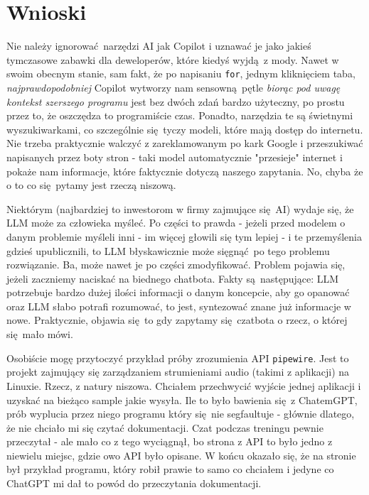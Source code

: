 	\newpage
\section{Wnioski}	%

Nie należy ignorować narzędzi AI jak Copilot i uznawać je jako jakieś tymczasowe zabawki dla deweloperów, które kiedyś wyjdą z mody. Nawet w swoim obecnym stanie, sam fakt, że po napisaniu \texttt{for}, jednym kliknięciem taba, \textit{najprawdopodobniej} Copilot wytworzy nam sensowną pętle \textit{biorąc pod uwagę kontekst szerszego programu} jest bez dwóch zdań bardzo użyteczny, po prostu przez to, że oszczędza to programiście czas. Ponadto, narzędzia te są świetnymi wyszukiwarkami, co szczególnie się tyczy modeli, które mają dostęp do internetu. Nie trzeba praktycznie walczyć z zareklamowanym po kark Google i przeszukiwać napisanych przez boty stron - taki model automatycznie "przesieje" internet i pokaże nam informacje, które faktycznie dotyczą naszego zapytania. No, chyba że o to co się pytamy jest rzeczą niszową.

Niektórym (najbardziej to inwestorom w firmy zajmujące się AI) wydaje się, że LLM może za człowieka myśleć. Po części to prawda - jeżeli przed modelem o danym problemie myśleli inni - im więcej głowili się tym lepiej - i te przemyślenia gdzieś upublicznili, to LLM błyskawicznie może sięgnąć po tego problemu rozwiązanie. Ba, może nawet je po części zmodyfikować. Problem pojawia się, jeżeli zaczniemy naciskać na biednego chatbota. Fakty są następujące: LLM potrzebuje bardzo dużej ilości informacji o danym koncepcie, aby go opanować oraz LLM słabo potrafi rozumować, to jest, syntezować znane już informacje w nowe. Praktycznie, objawia się to gdy zapytamy się czatbota o rzecz, o której się mało mówi. 

Osobiście mogę przytoczyć przykład próby zrozumienia API \texttt{pipewire}\cite{pipewiresite}. Jest to projekt zajmujący się zarządzaniem strumieniami audio (takimi z aplikacji) na Linuxie. Rzecz, z natury niszowa. Chciałem przechwycić wyjście jednej aplikacji i uzyskać na bieżąco sample jakie wysyła. Ile to było bawienia się z ChatemGPT, prób wyplucia przez niego programu który się nie segfaultuje - głównie dlatego, że nie chciało mi się czytać dokumentacji. Czat podczas treningu pewnie przeczytał - ale mało co z tego wyciągnął, bo strona z API to było jedno z niewielu miejsc, gdzie owo API było opisane. W końcu okazało się, że na stronie był przykład programu, który robił prawie to samo co chciałem i jedyne co ChatGPT mi dał to powód do przeczytania dokumentacji. 

